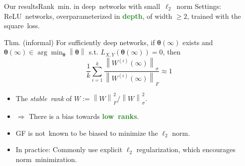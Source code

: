 \documentclass[handout,usenames,dvipsnames]{beamer} %
\newcommand{\norm}[2][]{{\left\|{#2}\right\|_{#1}}}
\newcommand{\btheta}{{\boldsymbol{\theta}}}
\newcommand{\true}[1]{{\textcolor{ForestGreen}{\textbf{#1}}}}
\begin{document}
\begin{frame}{Our results}{Rank~min. in deep~networks with small~$\ell_2$~norm}
    \pause
    Settings: ReLU~networks, overparameterized in \true{depth}, of width $\ge 2$, trained with the square~loss.
    \pause
    \begin{exampleblock}{Thm. (informal)}
        For sufficiently deep networks, if $\btheta(\infty)$ exists and $\btheta(\infty) \in \arg\min_{\btheta} \norm{\btheta}$ s.t. $L_{X,Y}(\btheta(\infty)) = 0$, then 
        \[
        \frac{1}{k}\sum_{i=1}^{k} \frac{\norm{W^{(i)}(\infty)}_\sigma}{\norm{W^{(i)}(\infty)}_F}
        \approx 1
        \]
    \end{exampleblock}
    \pause
    \begin{itemize}
        \item The \emph{stable~rank} of $W := {\norm{W}^2_F} / {\norm{W}^2_\sigma}$.
        \pause
        \item $\Rightarrow$ There is a bias towards \true{low~ranks}.
        \pause
        \item GF is \alert{not}~known to be biased to minimize the $\ell_2$ norm.
        \pause
        \item In practice: Commonly use explicit $\ell_2$ regularization, which encourages norm~minimization.
    \end{itemize}
    

\end{frame}
\end{document}
